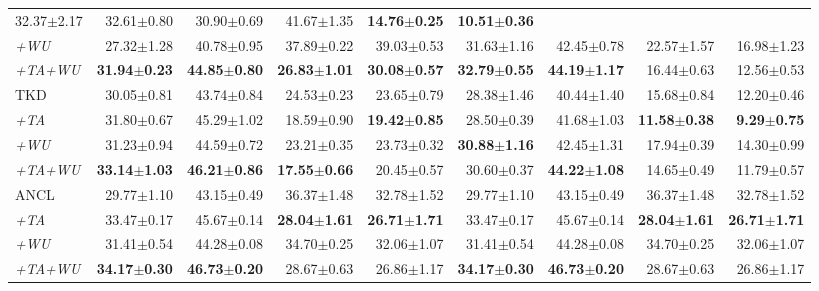 \begin{appendix}
\begin{table*}[!th]
{\begin{tabular}{@{}lrrrrrrrr@{}}
  32.37$\pm$2.17 &
  32.61$\pm$0.80 &
  30.90$\pm$0.69 &
  41.67$\pm$1.35 &
  \textbf{14.76$\pm$0.25} &
  \textbf{10.51$\pm$0.36} \\
\textit{+WU} &
  27.32$\pm$1.28 &
  40.78$\pm$0.95 &
  37.89$\pm$0.22 &
  39.03$\pm$0.53 &
  31.63$\pm$1.16 &
  42.45$\pm$0.78 &
  22.57$\pm$1.57 &
  16.98$\pm$1.23 \\
\textit{+TA+WU} &
  \textbf{31.94$\pm$0.23} &
  \textbf{44.85$\pm$0.80} &
  \textbf{26.83$\pm$1.01} &
  \textbf{30.08$\pm$0.57} &
  \textbf{32.79$\pm$0.55} &
  \textbf{44.19$\pm$1.17} &
  16.44$\pm$0.63 &
  12.56$\pm$0.53 \\
  \midrule
TKD &
  30.05$\pm$0.81 &
  43.74$\pm$0.84 &
  24.53$\pm$0.23 &
  23.65$\pm$0.79 &
  28.38$\pm$1.46 &
  40.44$\pm$1.40 &
  15.68$\pm$0.84 &
  12.20$\pm$0.46 \\
\textit{+TA} &
  31.80$\pm$0.67 &
  45.29$\pm$1.02 &
  18.59$\pm$0.90 &
  \textbf{19.42$\pm$0.85} &
  28.50$\pm$0.39 &
  41.68$\pm$1.03 &
  \textbf{11.58$\pm$0.38} &
  \textbf{9.29$\pm$0.75} \\
\textit{+WU} &
  31.23$\pm$0.94 &
  44.59$\pm$0.72 &
  23.21$\pm$0.35 &
  23.73$\pm$0.32 &
  \textbf{30.88$\pm$1.16} &
  42.45$\pm$1.31 &
  17.94$\pm$0.39 &
  14.30$\pm$0.99 \\
\textit{+TA+WU} &
  \textbf{33.14$\pm$1.03} &
  \textbf{46.21$\pm$0.86} &
  \textbf{17.55$\pm$0.66} &
  20.45$\pm$0.57 &
  30.60$\pm$0.37 &
  \textbf{44.22$\pm$1.08} &
  14.65$\pm$0.49 &
  11.79$\pm$0.57 \\

  \midrule
  ANCL &
  29.77$\pm$1.10 & 43.15$\pm$0.49 & 36.37$\pm$1.48 & 32.78$\pm$1.52 & 29.77$\pm$1.10  & 43.15$\pm$0.49 & 36.37$\pm$1.48 & 32.78$\pm$1.52 \\
  \textit{+TA} &
  33.47$\pm$0.17 & 45.67$\pm$0.14 & \textbf{28.04$\pm$1.61} & \textbf{26.71$\pm$1.71} & 33.47$\pm$0.17 & 45.67$\pm$0.14 & \textbf{28.04$\pm$1.61} & \textbf{26.71$\pm$1.71} \\
  \textit{+WU} &
  31.41$\pm$0.54 & 44.28$\pm$0.08 & 34.70$\pm$0.25  & 32.06$\pm$1.07 & 31.41$\pm$0.54 & 44.28$\pm$0.08 & 34.70$\pm$0.25  & 32.06$\pm$1.07 \\
  \textit{+TA+WU} &
  \textbf{34.17$\pm$0.30}  & \textbf{46.73$\pm$0.20}  & 28.67$\pm$0.63 & 26.86$\pm$1.17 & \textbf{34.17$\pm$0.30}  & \textbf{46.73$\pm$0.20}  & 28.67$\pm$0.63 & 26.86$\pm$1.17 \\
  \midrule
  

\end{tabular}}
\end{table*}
\end{appendix}
